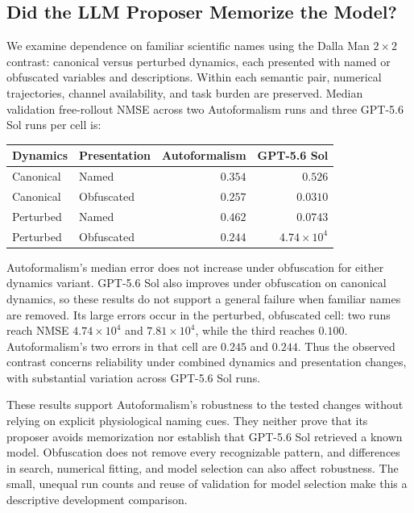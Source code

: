 \subsection{Did the LLM Proposer Memorize the Model?}
\label{sec:experiment_memorization}

We examine dependence on familiar scientific names using the Dalla Man
$2\times2$ contrast: canonical versus perturbed dynamics, each presented with
named or obfuscated variables and descriptions. Within each semantic pair,
numerical trajectories, channel availability, and task burden are preserved.
Median validation free-rollout NMSE across two Autoformalism runs and three
GPT-5.6 Sol runs per cell is:

\begin{center}
\begin{tabular}{llrr}
\hline
Dynamics & Presentation & Autoformalism & GPT-5.6 Sol \\
\hline
Canonical & Named      & $0.354$ & $0.526$ \\
Canonical & Obfuscated & $0.257$ & $0.0310$ \\
Perturbed & Named      & $0.462$ & $0.0743$ \\
Perturbed & Obfuscated & $0.244$ & $4.74\times10^4$ \\
\hline
\end{tabular}
\end{center}

Autoformalism's median error does not increase under obfuscation for either
dynamics variant. GPT-5.6 Sol also improves under obfuscation on canonical
dynamics, so these results do not support a general failure when familiar names
are removed. Its large errors occur in the perturbed, obfuscated cell: two runs
reach NMSE $4.74\times10^4$ and $7.81\times10^4$, while the third reaches $0.100$.
Autoformalism's two errors in that cell are $0.245$ and $0.244$. Thus the observed
contrast concerns reliability under combined dynamics and presentation changes,
with substantial variation across GPT-5.6 Sol runs.

These results support Autoformalism's robustness to the tested changes without
relying on explicit physiological naming cues. They neither prove that its
proposer avoids memorization nor establish that GPT-5.6 Sol retrieved a known
model. Obfuscation does not remove every recognizable pattern, and differences
in search, numerical fitting, and model selection can also affect robustness.
The small, unequal run counts and reuse of validation for model selection make
this a descriptive development comparison.
